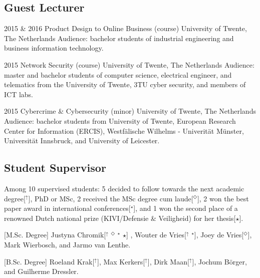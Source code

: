 \documentclass[]{friggeri-cv} %
\begin{document}
\newpage
\subsection{Guest Lecturer}
\begin{entrylist}
\entry
{2015 \& 2016}
{Product Design to Online Business (course)}
{University of Twente, The Netherlands}
{Audience: bachelor students of industrial engineering and business information technology.}

\entry
{2015}
{Network Security (course)}
{University of Twente, The Netherlands}
{Audience: master and bachelor students of computer science, electrical engineer, and telematics from the University of Twente, 3TU cyber security, and members of ICT labs. }

\entry
{2015}
{Cybercrime \& Cybersecurity (minor)}
{University of Twente, The Netherlands}
{Audience: bachelor students from University of Twente, European Research Center for Information (ERCIS), Westfälische Wilhelms - Univerität Münster, Universität Innsbruck, and University of Leicester. }
\end{entrylist}

\subsection{Student Supervisor}
Among 10 supervised students: 5 decided to follow towards the next academic degree[$^\uparrow$], PhD or MSc, 2 received the MSc degree cum laude[$^\Diamond$], 2 won the best paper award in international conferences[$^\star$], and 1 won the second place of a renowned Dutch national prize (KIVI/Defensie \& Veiligheid) for her thesis[$\star$].

\begin{entrylist}
\vspace{-0.3cm}
\entry
{[M.Sc. Degree]}
{Justyna Chromik[$^\uparrow$ $^\Diamond$ $^\star$ $\star$] , Wouter de Vries[$^\uparrow$ $^\star$], Joey de Vries[$^\Diamond$], Mark Wierbosch, and Jarmo van Lenthe.}
{}

\vspace{-0.3cm}
\entry
{[B.Sc. Degree]}
{Roeland Krak[$^\uparrow$], Max Kerkers[$^\uparrow$], Dirk Maan[$^\uparrow$], Jochum Börger, and Guilherme Dressler.}
{}


\end{entrylist}
\end{document}
